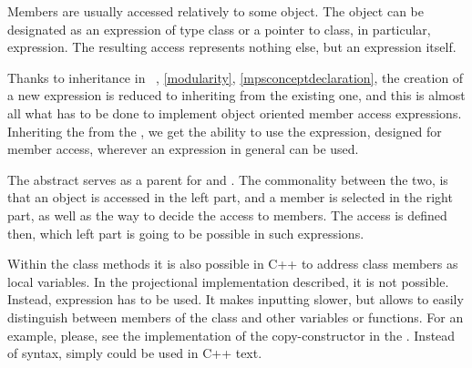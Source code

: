 
Members are usually accessed relatively to some object. The object can be designated as an expression of type class or a pointer to class,
in particular,  expression. The resulting access represents nothing else, but an expression itself.

Thanks to   inheritance in \jbmps\ , \ref{modularity}, \ref{mpsconceptdeclaration}, the creation of a new expression 
is reduced to inheriting from the existing one, and this is almost all what has to be done to implement object oriented member access expressions. 
Inheriting the   from the  
, we get the ability to use the expression, designed for member access, wherever an expression in general can be used. 

The abstract   serves as a parent for  and .
The commonality between the two, is that an object is accessed in the left part, and a member is selected in the right part, 
as well as the way to decide the access to members. The access is defined then, which left part is going to be possible in such expressions.


Within the class methods it is also possible in C++ to address class members as local variables. In the projectional implementation
described, it is not possible. Instead,  expression has to be used. It makes inputting slower, but allows to
easily distinguish between members of the class and other variables or functions. For an example, please, see the implementation of the 
copy-constructor in the . Instead of  syntax, simply  could be used in C++ text.
